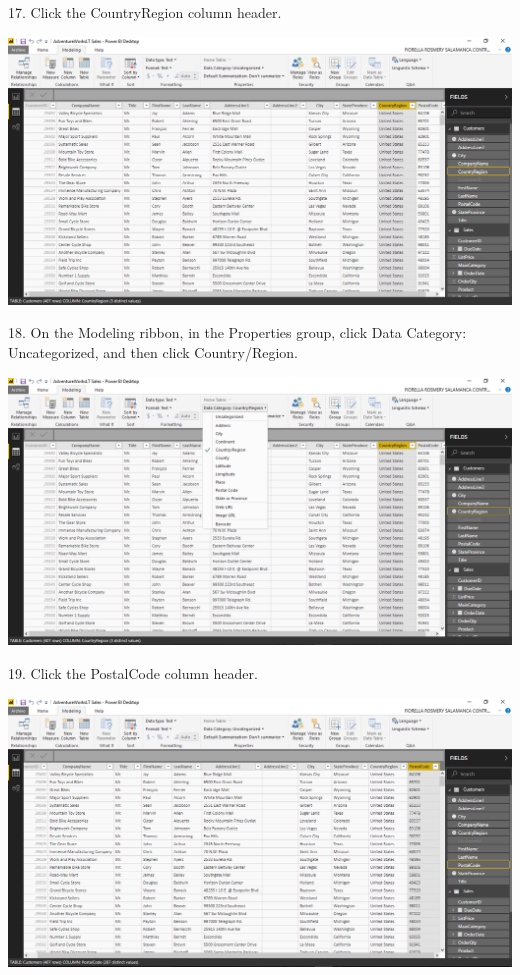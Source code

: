 17. Click the CountryRegion column header.\\

	\begin{center}
	\includegraphics[width=17cm]{./Imagenes/Ejercicio1/Tarea3/15}
	\end{center}	

18. On the Modeling ribbon, in the Properties group, click Data Category: Uncategorized, and then click Country/Region.\\

	\begin{center}
	\includegraphics[width=17cm]{./Imagenes/Ejercicio1/Tarea3/16}
	\end{center}	

19. Click the PostalCode column header.\\

	\begin{center}
	\includegraphics[width=17cm]{./Imagenes/Ejercicio1/Tarea3/17}
	\end{center}	

